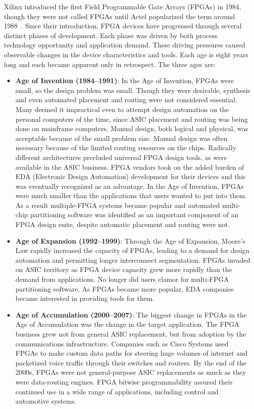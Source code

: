 \noindent Xilinx introduced the first Field Programmable Gate Arrays
(FPGAs) in 1984, though they were not called FPGAs until
Actel popularized the term around 1988~\cite{fpga2}. Since their introduction, FPGA devices have progressed
through several distinct phases of development.
Each phase was driven by both process technology opportunity
and application demand. These driving pressures
caused observable changes in the device characteristics
and tools. Each age is eight years long and each
became apparent only in retrospect. The three ages are:
\begin{itemize}
	\item \textbf{Age of Invention (1984–1991)}:
	In the Age of Invention, FPGAs were small, so the design problem was small. Though they were desirable, synthesis
	and even automated placement and routing were not considered essential. Many deemed it impractical even to
	attempt design automation on the personal computers of the time, since ASIC placement and routing was being
	done on mainframe computers.
	Manual design, both
	logical and physical, was acceptable because of the small problem size. Manual design was often necessary because
	of the limited routing resources on the chips.
	Radically different architectures precluded universal FPGA design tools, as were available in the ASIC business.
	FPGA vendors took on the added burden of EDA (Electronic Design Automation) development for their devices and this was eventually recognized as an advantage.
	\newline
	In the Age of Invention, FPGAs were much smaller than the applications that users wanted to put into them. As a
	result multiple-FPGA systems became popular and automated multi-chip partitioning software was identified as
	an important component of an FPGA design suite, despite automatic placement and routing were not.
	\item \textbf{Age of Expansion (1992–1999)}:
	Through the Age of Expansion, Moore’s Law rapidly increased the capacity of FPGAs, leading to a demand for
	design automation and permitting longer interconnect segmentation.
	FPGAs invaded on ASIC territory as FPGA device capacity grew more rapidly than the
	demand from applications. No longer did users clamor for multi-FPGA partitioning software.
	As FPGAs became more popular, EDA companies became interested in providing tools for them.
	\item \textbf{Age of Accumulation (2000–2007)}:
	The biggest change in FPGAs in the Age of Accumulation was the change in the target application. The FPGA
	business grew not from general ASIC replacement, but from adoption by the communications infrastructure. Companies
	such as Cisco Systems used FPGAs to make custom data paths for steering huge volumes of internet and packetized
	voice traffic through their switches and routers.
	By the end of the 2000s, FPGAs were not general-purpose ASIC replacements as much as they were data-routing engines.
	FPGA bitwise programmability assured their continued use in a wide range of applications, including control and automotive systems.
\end{itemize}


